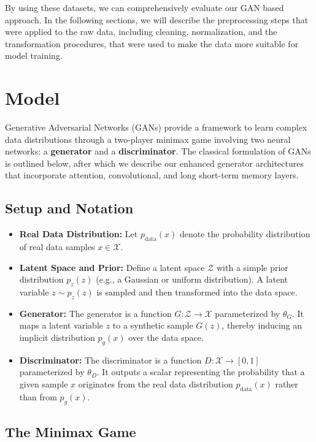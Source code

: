 \documentclass{article}
\begin{document}
By using these datasets, we can comprehensively evaluate our GAN based approach. In the following sections, we will describe the preprocessing steps that were applied to the raw data, including cleaning, normalization, and the transformation procedures, that were used to make the data more suitable for model training.

\section{Model}

Generative Adversarial Networks (GANs) provide a framework to learn complex data distributions through a two-player minimax game involving two neural networks: a \textbf{generator} and a \textbf{discriminator}. The classical formulation of GANs is outlined below, after which we describe our enhanced generator architectures that incorporate attention, convolutional, and long short-term memory layers.

\subsection*{Setup and Notation}

\begin{itemize}
    \item \textbf{Real Data Distribution:} Let $p_{\text{data}}(x)$ denote the probability distribution of real data samples $x \in \mathcal{X}$.
    \item \textbf{Latent Space and Prior:} Define a latent space $\mathcal{Z}$ with a simple prior distribution $p_z(z)$ (e.g., a Gaussian or uniform distribution). A latent variable $z \sim p_z(z)$ is sampled and then transformed into the data space.
    \item \textbf{Generator:} The generator is a function $G: \mathcal{Z} \to \mathcal{X}$ parameterized by $\theta_G$. It maps a latent variable $z$ to a synthetic sample $G(z)$, thereby inducing an implicit distribution $p_g(x)$ over the data space.
    \item \textbf{Discriminator:} The discriminator is a function $D: \mathcal{X} \to [0,1]$ parameterized by $\theta_D$. It outputs a scalar representing the probability that a given sample $x$ originates from the real data distribution $p_{\text{data}}(x)$ rather than from $p_g(x)$.
\end{itemize}

\subsection*{The Minimax Game}
\end{document}
